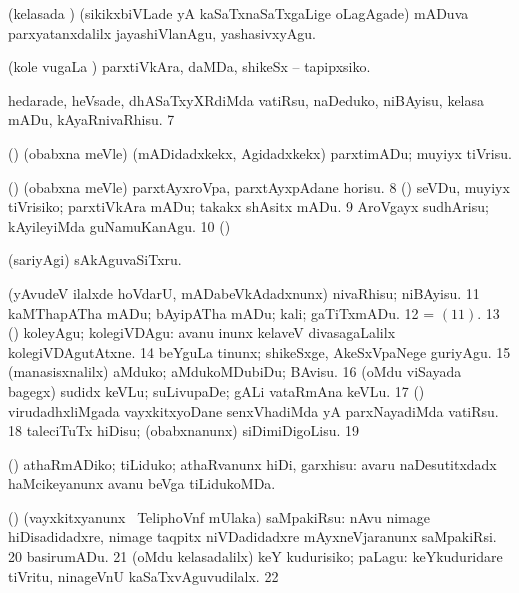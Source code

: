 { (kelasada \vi) (sikikxbiVLade yA kaSaTxnaSaTxgaLige oLagAgade)
mADuva parxyatanxdalilx jayashiVlanAgu, yashasivxyAgu. 

 (kole \mo vugaLa \vi) parxtiVkAra, daMDa, shikeSx -- tapipxsiko. 

 hedarade, heVsade, dhASaTxyXRdiMda vatiRsu, naDeduko,
niBAyisu, kelasa mADu, kAyaRnivaRhisu.
\num{7}  

 (\AmA) (obabxna meVle) (mADidadxkekx, Agidadxkekx)
parxtimADu; muyiyx tiVrisu. 

 (\AmA) (obabxna meVle) parxtAyxroVpa, 
parxtAyxpAdane horisu. 
\num{8}  (\ashi) seVDu,
muyiyx tiVrisiko; parxtiVkAra mADu; takakx shAsitx mADu. 
\hypertarget{get nuga9}{}
\num{9}  AroVgayx sudhArisu; kAyileyiMda guNamuKanAgu. 
\num{10}  (\AmA) 

 (sariyAgi) sAkAguvaSiTxru. 

 (yAvudeV ilalxde hoVdarU, mADabeVkAdadxnunx) nivaRhisu; niBAyisu. 
\hypertarget{get nuga11}{}
\num{11}  kaMThapATha mADu; bAyipATha mADu; kali; gaTiTxmADu. 
\num{12}  = \hyperlink{get nuga11}{\nuga $(11)$}.
\num{13}  (\ashi) koleyAgu; kolegiVDAgu:
 avanu inunx kelaveV divasagaLalilx kolegiVDAgutAtxne. 
\num{14}  beYguLa tinunx; shikeSxge, AkeSxVpaNege guriyAgu.
\num{15}  (manasisxnalilx) aMduko; aMdukoMDubiDu;
BAvisu. 
\hypertarget{get nuga16}{}
\num{16}  (oMdu viSayada bagegx) sudidx keVLu;
suLivupaDe; gALi vataRmAna keVLu. 
\num{17}  (\AmA) virudadhxliMgada vayxkitxyoDane
senxVhadiMda yA parxNayadiMda vatiRsu.
\num{18}  taleciTuTx hiDisu; (obabxnanunx) siDimiDigoLisu.
\num{19}  

 (\AmA) athaRmADiko; tiLiduko; athaRvanunx
hiDi, garxhisu:  avaru
naDesutitxdadx haMcikeyanunx avanu beVga tiLidukoMDa. 

 (\AmA) (vayxkitxyanunx \udA\  TeliphoVnf mUlaka)
saMpakiRsu:  nAvu nimage hiDisadidadxre, nimage taqpitx niVDadidadxre
mAyxneVjaranunx saMpakiRsi.
\num{20}  basirumADu.
\num{21}  (oMdu kelasadalilx) keY kudurisiko; paLagu:
 keYkuduridare
tiVritu, ninageVnU kaSaTxvAguvudilalx. 
\num{22}  

}
